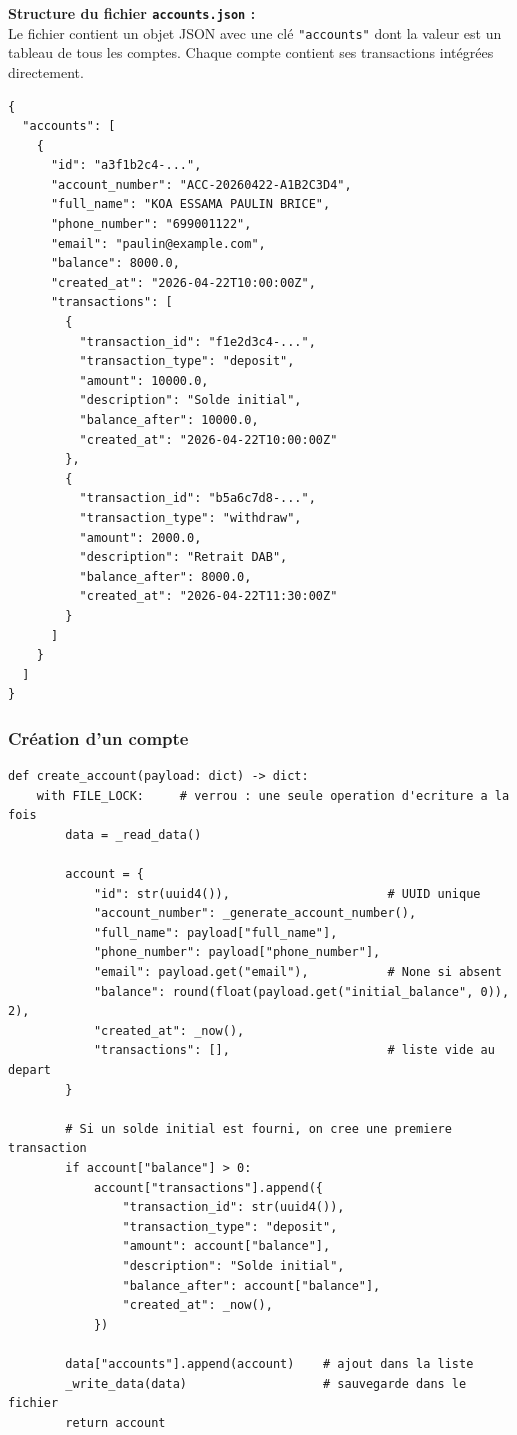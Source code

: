\documentclass[12pt,a4paper]{article}
\begin{document}
\begin{infobox}
\textbf{Structure du fichier \texttt{accounts.json} :}\\
Le fichier contient un objet JSON avec une clé \texttt{"accounts"} dont la valeur est un tableau de tous les comptes. Chaque compte contient ses transactions intégrées directement.
\end{infobox}

\begin{lstlisting}[style=json, caption={Exemple de contenu de accounts.json}]
{
  "accounts": [
    {
      "id": "a3f1b2c4-...",
      "account_number": "ACC-20260422-A1B2C3D4",
      "full_name": "KOA ESSAMA PAULIN BRICE",
      "phone_number": "699001122",
      "email": "paulin@example.com",
      "balance": 8000.0,
      "created_at": "2026-04-22T10:00:00Z",
      "transactions": [
        {
          "transaction_id": "f1e2d3c4-...",
          "transaction_type": "deposit",
          "amount": 10000.0,
          "description": "Solde initial",
          "balance_after": 10000.0,
          "created_at": "2026-04-22T10:00:00Z"
        },
        {
          "transaction_id": "b5a6c7d8-...",
          "transaction_type": "withdraw",
          "amount": 2000.0,
          "description": "Retrait DAB",
          "balance_after": 8000.0,
          "created_at": "2026-04-22T11:30:00Z"
        }
      ]
    }
  ]
}
\end{lstlisting}

\subsubsection{Création d'un compte}

\begin{lstlisting}[style=python, caption={storage.py — create\_account()}]
def create_account(payload: dict) -> dict:
    with FILE_LOCK:     # verrou : une seule operation d'ecriture a la fois
        data = _read_data()

        account = {
            "id": str(uuid4()),                      # UUID unique
            "account_number": _generate_account_number(),
            "full_name": payload["full_name"],
            "phone_number": payload["phone_number"],
            "email": payload.get("email"),           # None si absent
            "balance": round(float(payload.get("initial_balance", 0)), 2),
            "created_at": _now(),
            "transactions": [],                      # liste vide au depart
        }

        # Si un solde initial est fourni, on cree une premiere transaction
        if account["balance"] > 0:
            account["transactions"].append({
                "transaction_id": str(uuid4()),
                "transaction_type": "deposit",
                "amount": account["balance"],
                "description": "Solde initial",
                "balance_after": account["balance"],
                "created_at": _now(),
            })

        data["accounts"].append(account)    # ajout dans la liste
        _write_data(data)                   # sauvegarde dans le fichier
        return account
\end{lstlisting}
\end{document}
